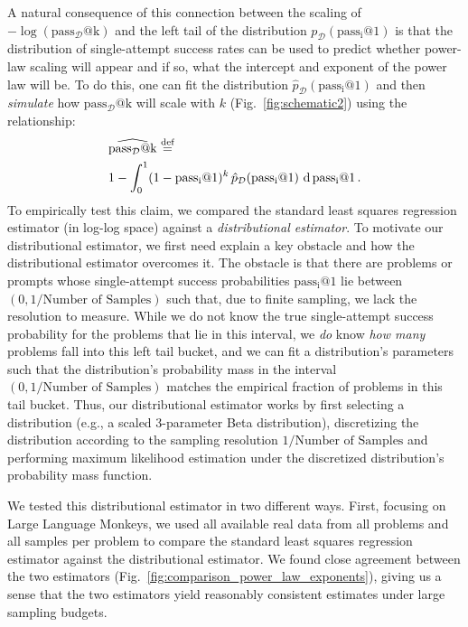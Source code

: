 A natural consequence of this connection between the scaling of $-\log(\operatorname{pass_{\mathcal{D}}@k})$ and the left tail of the distribution $p_{\mathcal{D}}(\operatorname{pass_i@1})$ is that the distribution of single-attempt success rates can be used to predict whether power-law scaling will appear and if so, what the intercept and exponent of the power law will be. To do this, one can fit the distribution $\hat{p}_{\mathcal{D}}(\operatorname{pass_i@1})$ and then \textit{simulate} how $\operatorname{pass_{\mathcal{D}}@k}$ will scale with $k$ (Fig.~\ref{fig:schematic2}) using the relationship:
%
\begin{equation}
\begin{aligned}
&\widehat{\operatorname{pass_{\mathcal{D}}@k}} \operatorname{\stackrel{\text{def}}{\;=\;}} \\
&1 - \int_0^1 (1 - \operatorname{pass_i@1})^k \, \hat{p}_{\mathcal{D}}(\operatorname{pass_i@1}) \, \operatorname{d\,pass_i@1}.
\end{aligned}
\end{equation}
%
To empirically test this claim, we compared the standard least squares regression estimator (in log-log space) \citep{hoffmann2022trainingcomputeoptimallargelanguage,caballero2022broken,besiroglu2024chinchillascalingreplicationattempt} against a \textit{distributional estimator}.
To motivate our distributional estimator, we first need explain a key obstacle and how the distributional estimator overcomes it.
The obstacle is that there are problems or prompts whose single-attempt success probabilities $\operatorname{pass_i@1}$ lie between $(0, 1/\text{Number of Samples})$ such that, due to finite sampling, we lack the resolution to measure.
While we do not know the true single-attempt success probability for the problems that lie in this interval, we \textit{do} know \textit{how many} problems fall into this left tail bucket, and we can fit a distribution's parameters such that the distribution's probability mass in the interval $(0, 1 / \text{Number of Samples})$ matches the empirical fraction of problems in this tail bucket. Thus, our distributional estimator works by first selecting a distribution (e.g., a scaled 3-parameter Beta distribution), discretizing the distribution according to the sampling resolution $1 / \text{Number of Samples}$ and performing maximum likelihood estimation under the discretized distribution's probability mass function.

We tested this distributional estimator in two different ways. First, focusing on Large Language Monkeys, we used all available real data from all problems and all samples per problem to compare the standard least squares regression estimator against the distributional estimator. 
We found close agreement between the two estimators (Fig.~\ref{fig:comparison_power_law_exponents}), giving us a sense that the two estimators yield reasonably consistent estimates under large sampling budgets.

